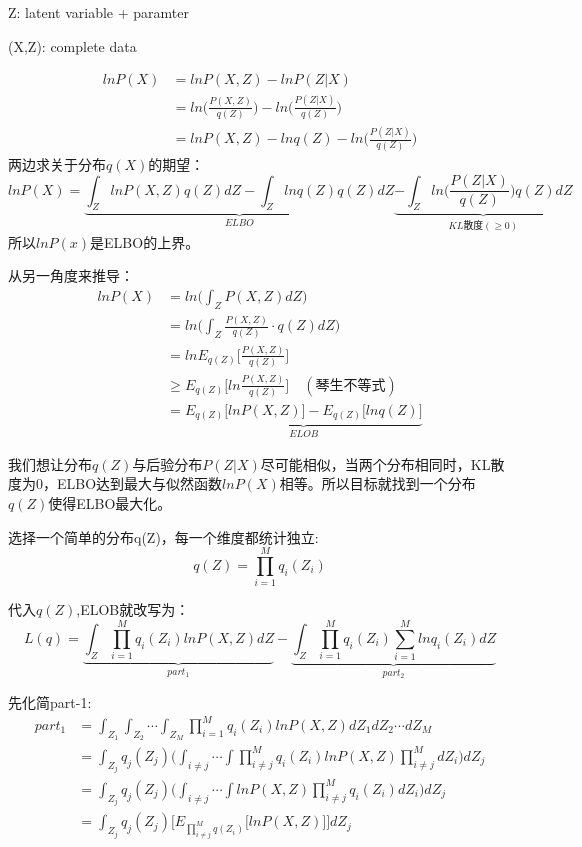 \documentclass[UTF8]{ctexart} %
\begin{document}
				Z: latent variable + paramter
				
				(X,Z): complete data
				
				\[\begin{aligned}
				lnP(X) &= lnP(X,Z) - lnP(Z|X)\\
				&= ln\Bigg(\frac{P(X,Z)}{q(Z)}\Bigg) - ln\Bigg(\frac{P(Z|X)}{q(Z)}\Bigg)\\
				&=  lnP(X,Z) -lnq(Z) - ln\Bigg(\frac{P(Z|X)}{q(Z)}\Bigg)
				\end{aligned}\]
				两边求关于分布$q(X)$的期望：
				\[lnP(X) = \underbrace{\int_ZlnP(X,Z)q(Z)dZ - \int_Zlnq(Z)q(Z)dZ}_{ELBO}  \underbrace{-\int_Zln\Bigg(\frac{P(Z|X)}{q(Z)}\Bigg)q(Z)dZ}_{KL\text{散度}(\geq0)}\]
				所以$lnP(x)$是ELBO的上界。
				
				从另一角度来推导：
				\[\begin{aligned}
				lnP(X)& = ln\Big(\int_ZP(X,Z)dZ\Big)\\
				&= ln\Big(\int_Z\frac{P(X,Z)}{q(Z)}\cdot q(Z)dZ\Big)\\
				&= lnE_{q(Z)}\Big[\frac{P(X,Z)}{q(Z)}\Big]\\
				&\geq E_{q(Z)}\Big[ln\frac{P(X,Z)}{q(Z)}\Big]\quad (\text{琴生不等式})\\
				& = \underbrace{E_{q(Z)}\Big[lnP(X,Z)\Big] - E_{q(Z)}\Big[lnq(Z)\Big]}_{ELOB}
				\end{aligned}\] 
				
				我们想让分布$q(Z)$与后验分布$P(Z|X)$尽可能相似，当两个分布相同时，KL散度为0，ELBO达到最大与似然函数$lnP(X)$相等。所以目标就找到一个分布$q(Z)$使得ELBO最大化。
				
				选择一个简单的分布q(Z)，每一个维度都统计独立:
				\[q(Z) = \prod_{i=1}^Mq_i(Z_i)\]
				
				代入$q(Z)$,ELOB就改写为：
				\[L(q) =\underbrace{\int_Z\prod_{i=1}^Mq_i(Z_i)lnP(X,Z)dZ}_{part_1} - \underbrace{\int_Z\prod_{i=1}^Mq_i(Z_i)\sum_{i=1}^Mlnq_i(Z _i)dZ}_{part_2} \]
				
				先化简part-1:
				\[\begin{aligned}
				part_1 &= \int_{Z_1}\int_{Z_2}\cdots\int_{Z_M}\prod_{i=1}^Mq_i(Z_i)lnP(X,Z)dZ_1dZ_2\cdots dZ_M\\
				&= \int_{Z_j} q_j(Z_j)\Bigg(\int_{i\neq j}\cdots\int\prod_{i\neq j}^Mq_i(Z_i)lnP(X,Z)\prod_{i\neq j}^MdZ_i\Bigg)dZ_j\\
				& =  \int_{Z_j} q_j(Z_j)\Bigg(\int_{i\neq j}\cdots\int lnP(X,Z)\prod_{i\neq j}^Mq_i(Z_i)dZ_i\Bigg)dZ_j\\
				& = \int_{Z_j} q_j(Z_j)\Bigg[E_{\prod_{i\neq j}^Mq(Z_i)}\bigg[lnP(X,Z)\bigg]\Bigg]dZ_j
				\end{aligned}\]
			
\end{document}
